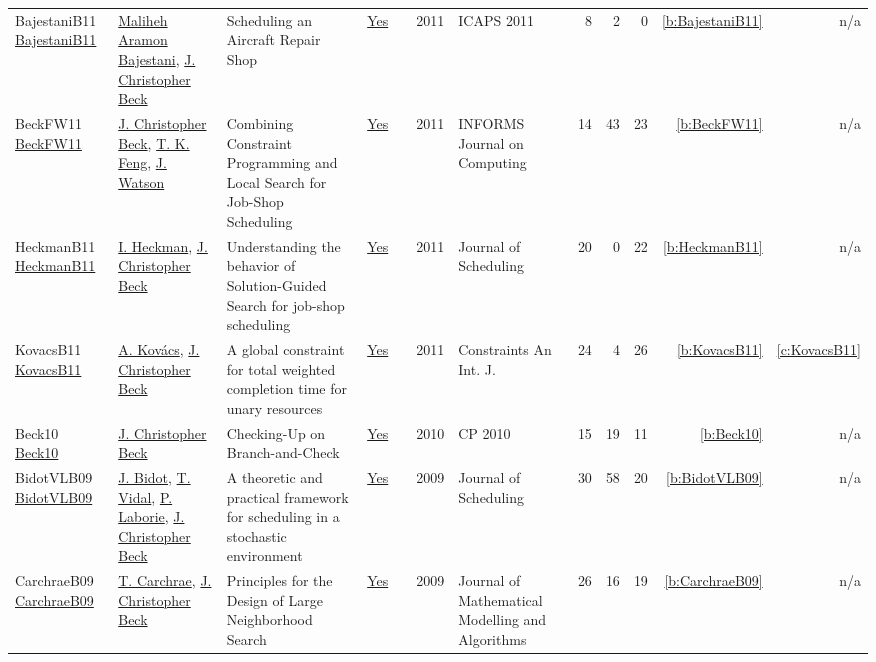 {\begin{longtable}{>{\raggedright\arraybackslash}p{3cm}>{\raggedright\arraybackslash}p{6cm}>{\raggedright\arraybackslash}p{6.5cm}rrrp{2.5cm}rrrrr}
BajestaniB11 \href{http://aaai.org/ocs/index.php/ICAPS/ICAPS11/paper/view/2680}{BajestaniB11} & \hyperref[auth:a823]{Maliheh Aramon Bajestani}, \hyperref[auth:a89]{J. Christopher Beck} & Scheduling an Aircraft Repair Shop & \href{../works/BajestaniB11.pdf}{Yes} & \cite{BajestaniB11} & 2011 & ICAPS 2011 & 8 & 2 & 0 & \ref{b:BajestaniB11} & n/a\\
BeckFW11 \href{https://doi.org/10.1287/ijoc.1100.0388}{BeckFW11} & \hyperref[auth:a89]{J. Christopher Beck}, \hyperref[auth:a828]{T. K. Feng}, \hyperref[auth:a363]{J. Watson} & Combining Constraint Programming and Local Search for Job-Shop Scheduling & \href{../works/BeckFW11.pdf}{Yes} & \cite{BeckFW11} & 2011 & INFORMS Journal on Computing & 14 & 43 & 23 & \ref{b:BeckFW11} & n/a\\
HeckmanB11 \href{https://doi.org/10.1007/s10951-009-0113-0}{HeckmanB11} & \hyperref[auth:a829]{I. Heckman}, \hyperref[auth:a89]{J. Christopher Beck} & Understanding the behavior of Solution-Guided Search for job-shop scheduling & \href{../works/HeckmanB11.pdf}{Yes} & \cite{HeckmanB11} & 2011 & Journal of Scheduling & 20 & 0 & 22 & \ref{b:HeckmanB11} & n/a\\
KovacsB11 \href{https://doi.org/10.1007/s10601-009-9088-x}{KovacsB11} & \hyperref[auth:a147]{A. Kov{\'{a}}cs}, \hyperref[auth:a89]{J. Christopher Beck} & A global constraint for total weighted completion time for unary resources & \href{../works/KovacsB11.pdf}{Yes} & \cite{KovacsB11} & 2011 & Constraints An Int. J. & 24 & 4 & 26 & \ref{b:KovacsB11} & \ref{c:KovacsB11}\\
Beck10 \href{https://doi.org/10.1007/978-3-642-15396-9_10}{Beck10} & \hyperref[auth:a89]{J. Christopher Beck} & Checking-Up on Branch-and-Check & \href{../works/Beck10.pdf}{Yes} & \cite{Beck10} & 2010 & CP 2010 & 15 & 19 & 11 & \ref{b:Beck10} & n/a\\
BidotVLB09 \href{https://doi.org/10.1007/s10951-008-0080-x}{BidotVLB09} & \hyperref[auth:a830]{J. Bidot}, \hyperref[auth:a831]{T. Vidal}, \hyperref[auth:a118]{P. Laborie}, \hyperref[auth:a89]{J. Christopher Beck} & A theoretic and practical framework for scheduling in a stochastic environment & \href{../works/BidotVLB09.pdf}{Yes} & \cite{BidotVLB09} & 2009 & Journal of Scheduling & 30 & 58 & 20 & \ref{b:BidotVLB09} & n/a\\
CarchraeB09 \href{http://dx.doi.org/10.1007/s10852-008-9100-2}{CarchraeB09} & \hyperref[auth:a274]{T. Carchrae}, \hyperref[auth:a89]{J. Christopher Beck} & Principles for the Design of Large Neighborhood Search & \href{../works/CarchraeB09.pdf}{Yes} & \cite{CarchraeB09} & 2009 & Journal of Mathematical Modelling and Algorithms & 26 & 16 & 19 & \ref{b:CarchraeB09} & n/a\\

\end{longtable}}
